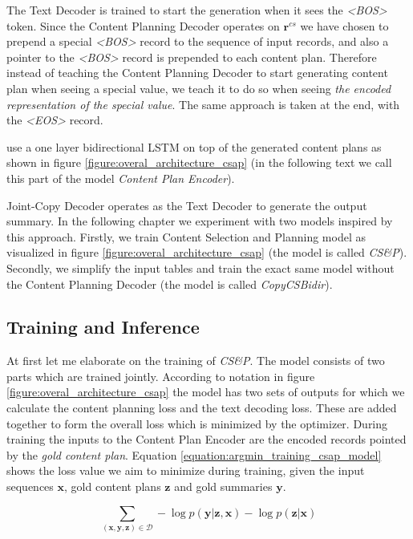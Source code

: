 The Text Decoder is trained to start the generation when it sees the \emph{\textless BOS\textgreater} token. Since the Content Planning Decoder operates on $\boldsymbol{r}^{cs}$ we have chosen to prepend a special \emph{\textless BOS\textgreater} record to the sequence of input records, and also a pointer to the \emph{\textless BOS\textgreater} record is prepended to each content plan. Therefore instead of teaching the Content Planning Decoder to start generating content plan when seeing a special value, we teach it to do so when seeing \emph{the encoded representation of the special value}. The same approach is taken at the end, with the \emph{\textless EOS\textgreater} record.

\citet{puduppully2019datatotext} use a one layer bidirectional LSTM on top of the generated content plans as shown in figure \ref{figure:overal_architecture_csap} (in the following text we call this part of the model \emph{Content Plan Encoder}).

Joint-Copy Decoder operates as the Text Decoder to generate the output summary. In the following chapter we experiment with two models inspired by this approach. Firstly, we train Content Selection and Planning model as visualized in figure \ref{figure:overal_architecture_csap} (the model is called \emph{CS\&P}). Secondly, we simplify the input tables and train the exact same model without the Content Planning Decoder (the model is called \emph{CopyCSBidir}).

\subsection{Training and Inference}

At first let me elaborate on the training of \emph{CS\&P}. The model consists of two parts which are trained jointly. According to notation in figure \ref{figure:overal_architecture_csap} the model has two sets of outputs for which we calculate the content planning loss and the text decoding loss. These are added together to form the overall loss which is minimized by the optimizer. During training the inputs to the Content Plan Encoder are the encoded records pointed by the \emph{gold content plan}. Equation \ref{equation:argmin_training_csap_model} shows the loss value we aim to minimize during training, given the input sequences $\boldsymbol{x}$, gold content plans $\boldsymbol{z}$ and gold summaries $\boldsymbol{y}$.

\begin{equation} \label{equation:argmin_training_csap_model}
    \sum_{(\boldsymbol{x}, \boldsymbol{y}, \boldsymbol{z}) \in \mathcal{D}} - \log{p(\boldsymbol{y}|\boldsymbol{z}, \boldsymbol{x})} - \log{p(\boldsymbol{z} | \boldsymbol{x})}
\end{equation}

